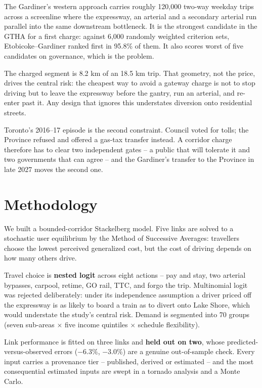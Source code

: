 \documentclass[11pt,letterpaper]{article}
\begin{document}
The Gardiner's western approach carries roughly 120{,}000 two-way weekday trips
across a screenline where the expressway, an arterial and a secondary arterial
run parallel into the same downstream bottleneck. It is the strongest candidate
in the GTHA for a first charge: against 6{,}000 randomly weighted criterion
sets, Etobicoke--Gardiner ranked first in 95.8\% of them. It also scores worst
of five candidates on governance, which is the problem.

The charged segment is 8.2 km of an 18.5 km trip. That geometry, not the price,
drives the central risk: the cheapest way to avoid a gateway charge is not to
stop driving but to leave the expressway before the gantry, run an arterial, and
re-enter past it. Any design that ignores this understates diversion onto
residential streets.

Toronto's 2016--17 episode is the second constraint. Council voted for tolls;
the Province refused and offered a gas-tax transfer instead. A corridor charge
therefore has to clear two independent gates -- a public that will tolerate it
and two governments that can agree -- and the Gardiner's transfer to the
Province in late 2027 moves the second one.

\section*{Methodology}

We built a bounded-corridor Stackelberg model. Five links are solved to a
stochastic user equilibrium by the Method of Successive Averages: travellers
choose the lowest perceived generalized cost, but the cost of driving depends on
how many others drive.

Travel choice is \textbf{nested logit} across eight actions -- pay and stay,
two arterial bypasses, carpool, retime, GO rail, TTC, and forgo the trip.
Multinomial logit was rejected deliberately: under its independence assumption a
driver priced off the expressway is as likely to board a train as to divert onto
Lake Shore, which would understate the study's central risk. Demand is
segmented into 70 groups (seven sub-areas $\times$ five income quintiles
$\times$ schedule flexibility).

Link performance is fitted on three links and \textbf{held out on two}, whose
predicted-versus-observed errors ($-6.3\%$, $-3.0\%$) are a genuine
out-of-sample check. Every input carries a provenance tier -- published, derived
or estimated -- and the most consequential estimated inputs are swept in a
tornado analysis and a Monte Carlo.
\end{document}
